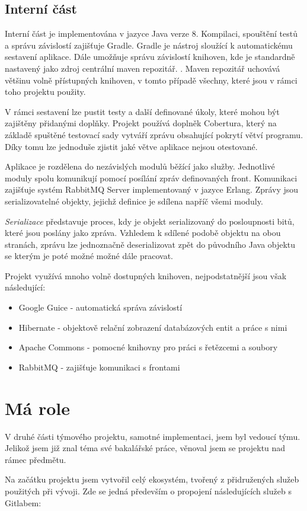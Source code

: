 \documentclass[thesis=B,czech]{FITthesis}[2012/06/26]
\begin{document}
\subsection{Interní část}
Interní část je implementována v jazyce Java verze 8. Kompilaci, spouštění testů a správu závislostí zajišťuje Gradle\cite{gradle}.
Gradle je nástroj sloužící k automatickému sestavení aplikace. Dále umožňuje správu závislostí knihoven, kde je standardně nastavený jako zdroj
centrální maven repozitář. \cite{mavenRepo}. Maven repozitář uchovává většinu volně přístupných knihoven, v tomto případě všechny, které jsou v rámci toho projektu použity.
\par
V rámci sestavení lze pustit testy a další definované úkoly, které mohou být zajištěny přidanými doplňky. Projekt používá
doplněk Cobertura\cite{cobertura}, který na základě spuštěné testovací sady vytváří zprávu obsahující pokrytí větví programu.
Díky tomu lze jednoduše zjistit jaké větve aplikace nejsou otestované.
\par
Aplikace je rozdělena do nezávislých modulů běžící jako služby. Jednotlivé moduly spolu komunikují
pomocí posílání zpráv definovaných front. Komunikaci zajišťuje systém RabbitMQ Server implementovaný v jazyce Erlang. Zprávy jsou serializovatelné objekty, jejichž definice je sdílena napříč všemi moduly.
\par
\textit{Serializace} představuje proces, kdy je objekt serializovaný do posloupnosti bitů, které jsou poslány jako zpráva. 
Vzhledem k sdílené podobě objektu na obou stranách, zprávu lze jednoznačně deserializovat zpět do původního Java objektu se kterým
je poté možné možné dále pracovat.\cite{serialization}
\par
Projekt využívá mnoho volně dostupných knihoven, nejpodstatnější jsou však následující:
\begin{itemize}
\item Google Guice - automatická správa závislostí \cite{guice}
\item Hibernate - objektově relační zobrazení databázových entit a práce s nimi \cite{hibernate}
\item Apache Commons - pomocné knihovny pro práci s řetězcemi a soubory \cite{commons}
\item RabbitMQ - zajišťuje komunikaci s frontami \cite{rabbitMQ}
\end{itemize}

\section{Má role}
V druhé části týmového projektu, samotné implementaci, jsem byl vedoucí týmu. Jelikož jsem již znal téma své bakalářské práce, 
věnoval jsem se projektu nad rámec předmětu.
\par
Na začátku projektu jsem vytvořil celý ekosystém, tvořený z přidružených služeb použitých při vývoji.
Zde se jedná především o propojení následujících služeb s Gitlabem:
\end{document}
